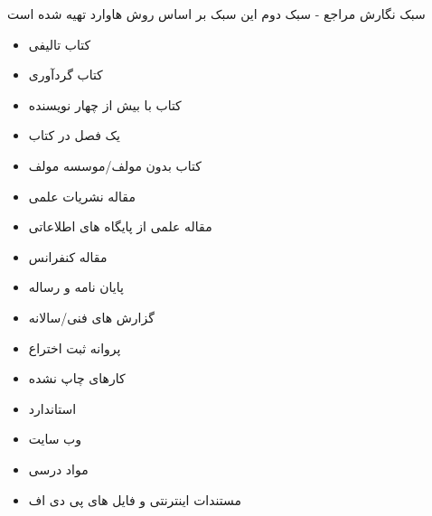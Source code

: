\documentclass[14pt]{beamer}
\makeatletter
\newcommand{\rtlist}{\raggedleft\rightskip\@totalleftmargin}
\newcommand{\framefontsizelarge}{\fontsize{18pt}{0pt}\selectfont}
\newcommand{\frametitlefontsize}{\fontsize{20pt}{0pt}\selectfont}
\makeatother
\begin{document}
\begin{persian}
	\begin{frame}[allowframebreaks]{\frametitlefontsize  سبک نگارش مراجع - سبک دوم}
		\framefontsizelarge
		این سبک بر اساس روش هاوارد تهیه شده است
		\begin{itemize}\rtlist
			\item کتاب تالیفی
			\item کتاب گردآوری
			\item کتاب با بیش از چهار نویسنده
			\item یک فصل در کتاب
			\item  کتاب بدون مولف/موسسه مولف
			\item مقاله نشریات علمی
			\item  مقاله علمی از پایگاه های اطلاعاتی
			\item مقاله کنفرانس
			\item پایان نامه و رساله
			\item گزارش های فنی/سالانه
			\item پروانه ثبت اختراع
			\item کارهای چاپ نشده
			\item استاندارد
			\item وب سایت
			\item مواد درسی
			\item مستندات اینترنتی و فایل های پی دی اف
		\end{itemize}
	\end{frame}	

\end{persian}
\end{document}
